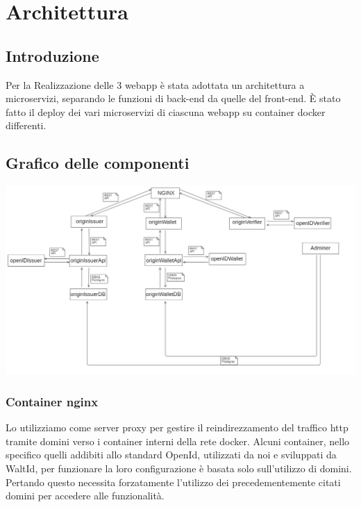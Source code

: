 \section{Architettura}

\subsection{Introduzione}
Per la Realizzazione delle 3 webapp è stata adottata un architettura a microservizi, separando le funzioni di back-end da quelle del front-end. È stato fatto il deploy dei vari microservizi di ciascuna webapp su container docker differenti.
\subsection{Grafico delle componenti}

\includegraphics[scale = 0.3]{./res/img/microservizi.png}


\subsubsection{Container \textbf{nginx}}
Lo utilizziamo come server proxy per gestire il reindirezzamento del traffico http tramite domini verso i container interni della rete docker. Alcuni container, nello specifico quelli addibiti allo standard OpenId, utilizzati da noi e sviluppati da WaltId, per funzionare la loro configurazione è basata solo sull'utilizzo di domini. Pertando questo necessita forzatamente l'utilizzo dei precedementemente citati domini per accedere alle funzionalità.  
